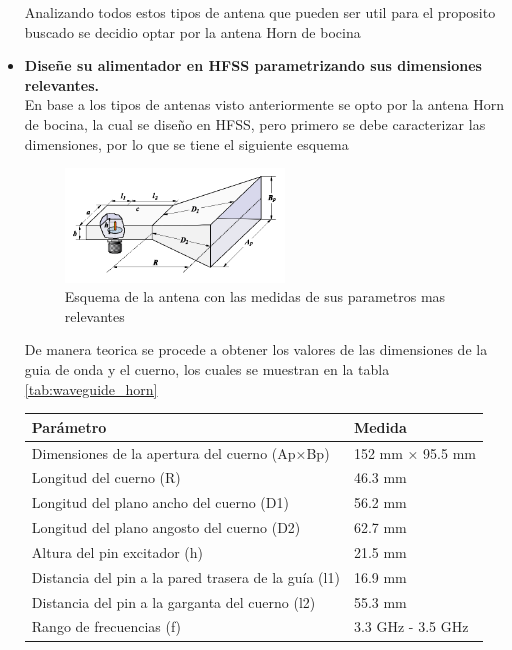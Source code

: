 \begin{itemize}
	Analizando todos estos tipos de antena que pueden ser util para el proposito buscado se decidio optar por la antena Horn de bocina
	\item \textbf{Diseñe su alimentador en HFSS parametrizando sus dimensiones relevantes.}\\
	En base a los tipos de antenas visto anteriormente se opto por la antena Horn de bocina, la cual se diseño en HFSS, pero primero se debe caracterizar las dimensiones, por lo que se tiene el siguiente esquema
	\begin{figure}[H]
		\centering
		\includegraphics[width=0.55\textwidth]{img/ejemplos/Figure_1}
		\caption{Esquema de la antena con las medidas de sus parametros mas relevantes}
	\end{figure}
	De manera teorica se procede a obtener los valores de las dimensiones de la guia de onda y el cuerno, los cuales se muestran en la tabla \ref{tab:waveguide_horn}
	\begin{table}[H]
		\centering
		\begin{tabular}{|l|l|}
		\hline
		\textbf{Parámetro}                                   & \textbf{Medida}              \\ \hline
		Dimensiones de la apertura del cuerno (Ap×Bp)       & 152 mm × 95.5 mm            \\ \hline
		Longitud del cuerno (R)                             & 46.3 mm                     \\ \hline
		Longitud del plano ancho del cuerno (D1)            & 56.2 mm                     \\ \hline
		Longitud del plano angosto del cuerno (D2)          & 62.7 mm                     \\ \hline
		Altura del pin excitador (h)                        & 21.5 mm                     \\ \hline
		Distancia del pin a la pared trasera de la guía (l1)& 16.9 mm                     \\ \hline
		Distancia del pin a la garganta del cuerno (l2)     & 55.3 mm                     \\ \hline
		Rango de frecuencias (f)                            & 3.3 GHz - 3.5 GHz         \\ \hline

\end{tabular}
\end{table}
\end{itemize}
